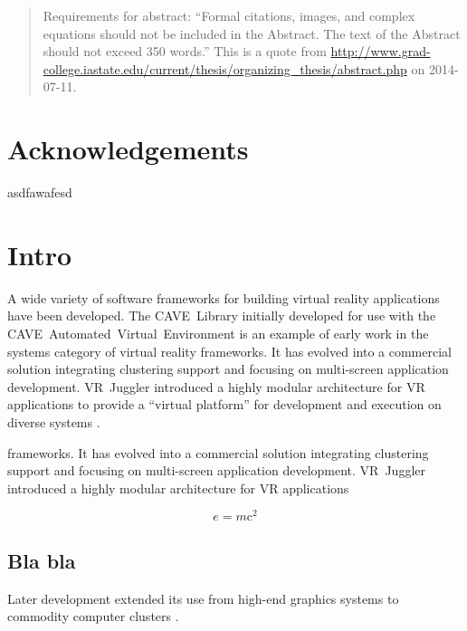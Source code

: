 \documentclass[capstoc,capschap,draftcls]{rpisudiss}
\begin{document}
\frontmatter
\maketitle

\tableofcontents
\listoffigures
\listoftables
\begin{abstract}
 Requirements for abstract:
 ``Formal citations, images, and complex equations should not be included in the Abstract.
 The text of the Abstract should not exceed 350 words.''
 This is a quote from \url{http://www.grad-college.iastate.edu/current/thesis/organizing_thesis/abstract.php} on 2014-07-11.
\end{abstract}

\chapter{Acknowledgements}
asdfawafesd

\mainmatter %

\chapter{Intro}


A wide variety of software frameworks for building virtual reality
applications have been developed. The CAVE~Library initially developed
for use with the CAVE~Automated~Virtual~Environment \cite{Cruz-Neira1993}
is an example of early work in the systems category of virtual reality
frameworks. It has evolved into a commercial solution integrating
clustering support and focusing on multi-screen application development.
VR~Juggler introduced a highly modular architecture for VR applications
to provide a ``virtual platform'' for development and execution
on diverse systems \cite{Bierbaum2001,Bierbaum2005}.

frameworks. It has evolved into a commercial solution integrating
clustering support and focusing on multi-screen application development.
VR~Juggler introduced a highly modular architecture for VR applications

\[e=m\mathrm{c}^2\]

\section{Bla bla}
Later development
extended its use from high-end graphics systems to commodity computer
clusters \cite{Allard2002,Bierbaum2005}.
\end{document}
